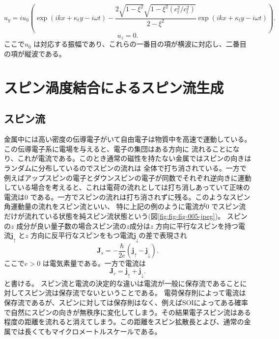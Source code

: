 \documentclass[dvipdfmx,11pt]{jsreport}
\numberwithin{equation}{chapter}
\numberwithin{table}{chapter}
\begin{document}
\begin{equation}
\label{eq:75}
	u_y=iu_0\left( \exp (ikx+\kappa_t y-i\omega t)-\frac{2\sqrt{1-\xi^2} \sqrt{1-\xi^2(c_t^2 / c_l^2)} }{2-\xi^2}\exp (ikx+\kappa_ly-i\omega t) \right) 
.\end{equation}
\begin{equation}
\label{eq:76}
	u_z=0
.\end{equation}
ここで$u_0$ は対応する振幅であり、これらの一番目の項が横波に対応し、二番目の項が縦波である。
\section{スピン渦度結合によるスピン流生成}
\subsection{スピン流}
金属中には高い密度の伝導電子がいて自由電子は物質中を高速で運動している。この伝導電子系に電場を与えると、電子の集団はある方向に
流れることになり、これが電流である。このとき通常の磁性を持たない金属ではスピンの向きはランダムに分布しているのでスピンの流れは
全体で打ち消されている。一方で例えばアップスピンの電子とダウンスピンの電子が同数でそれぞれ逆向きに運動している場合を考えると、これは電荷の流れとしては打ち消しあっていて正味の電流は$0$ である。一方でスピンの流れは打ち消されずに残る。このようなスピン角運動量の流れをスピン流といい、
特に上記の例のように電流が$0$ でスピン流だけが流れている状態を純スピン流状態という(図\ref{fig:fig-fig-005-jpeg})。
スピンの$z$ 成分が良い量子数の場合スピン流の$z$成分は$z$ 方向に平行なスピンを持つ電流$\bm{j}_{\uparrow}$ と$z$ 方向に反平行なスピンをもつ電流$\bm{j}_{\downarrow}$の差で表現され
\begin{equation}
\label{eq:77}
	\bm{J}_s=-\frac{\hbar}{2e}(\bm{j}_{\uparrow}-\bm{j}_{\downarrow})
.\end{equation}
ここで$e>0$ は電気素量である。一方で電流は
\begin{equation}
\label{eq:78}
	\bm{J}_c=\bm{j}_{\uparrow}+\bm{j}_{\downarrow}
.\end{equation}
と書ける。
スピン流と電流の決定的な違いは電流が一般に保存流であることに対してスピン流は保存流でないということである。
電荷保存則によって電流は保存流であるが、スピンに対しては保存則はなく、例えばSOIによってある確率で自然にスピンの向きが無秩序に変化してしまう。その結果電子スピン流はある程度の距離を流れると消えてしまう。この距離をスピン拡散長とよび、通常の金属では長くてもマイクロメートルスケールである。
\end{document}
